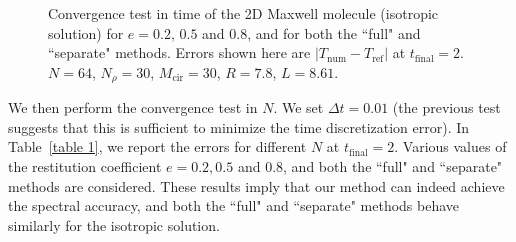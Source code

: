 \documentclass[review,times]{elsarticle}
\begin{document}
\begin{figure}[htp!]
  \caption{Convergence test in time of the 2D Maxwell molecule (isotropic solution) for $e=0.2$, $0.5$ and $0.8$, and for both the ``full" and ``separate" methods. Errors shown here are $|T_\text{num} - T_\text{ref}|$ at $t_\text{final}=2$. $N=64$, $N_{\rho}=30$, $M_{\text{cir}}=30$, $R=7.8$, $L=8.61$.}
  \label{dt_conv_1}
\end{figure}

We then perform the convergence test in $N$. We set $\Delta t = 0.01$ (the previous test suggests that this is sufficient to minimize the time discretization error). In Table~\ref{table 1}, we report the errors for different $N$ at $t_\text{final}=2$. Various values of the restitution coefficient $e = 0.2, 0.5$ and $0.8$, and both the ``full" and ``separate" methods are considered. These results imply that our method can indeed achieve the spectral accuracy, and both the ``full" and ``separate" methods behave similarly for the isotropic solution.
\end{document}
